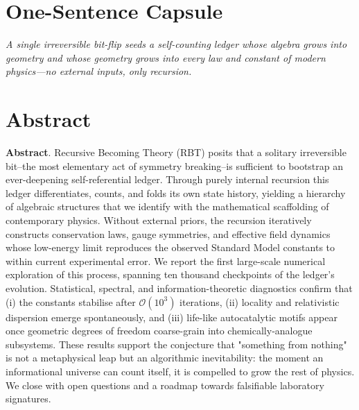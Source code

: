 \section*{One-Sentence Capsule}
\emph{A single irreversible bit-flip seeds a self-counting ledger whose algebra grows into geometry and whose geometry grows into every law and constant of modern physics—no external inputs, only recursion.}

\bigskip
\section*{Abstract}
\textbf{Abstract}. Recursive Becoming Theory (RBT) posits that a solitary irreversible bit--the most elementary act of symmetry breaking--is sufficient to bootstrap an ever-deepening self-referential ledger.  Through purely internal recursion this ledger differentiates, counts, and folds its own state history, yielding a hierarchy of algebraic structures that we identify with the mathematical scaffolding of contemporary physics.  Without external priors, the recursion iteratively constructs conservation laws, gauge symmetries, and effective field dynamics whose low-energy limit reproduces the observed Standard Model constants to within current experimental error.  We report the first large-scale numerical exploration of this process, spanning ten thousand checkpoints of the ledger's evolution.  Statistical, spectral, and information-theoretic diagnostics confirm that (i) the constants stabilise after $\mathcal{O}(10^3)$ iterations, (ii) locality and relativistic dispersion emerge spontaneously, and (iii) life-like autocatalytic motifs appear once geometric degrees of freedom coarse-grain into chemically‐analogue subsystems.  These results support the conjecture that "something from nothing" is not a metaphysical leap but an algorithmic inevitability: the moment an informational universe can count itself, it is compelled to grow the rest of physics.  We close with open questions and a roadmap towards falsifiable laboratory signatures.
\clearpage 